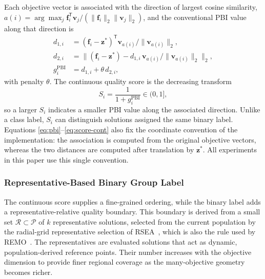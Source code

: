 \documentclass[final,5p,times,twocolumn]{elsarticle}
\newcommand{\vf}{\mathbf{f}}
\newcommand{\vv}{\mathbf{v}}
\newcommand{\vz}{\mathbf{z}}
\begin{document}
Each objective vector is associated with the direction of largest cosine
similarity, $a(i)=\arg\max_j
\vf_i^{\mathsf T}\vv_j/(\|\vf_i\|_2\|\vv_j\|_2)$, and the conventional
PBI value~\cite{ref:moead} along that direction is
\begin{equation}
\begin{aligned}
d_{1,i}&=(\vf_i-\vz^{*})^{\mathsf T}\vv_{a(i)}\big/\|\vv_{a(i)}\|_2,\\
d_{2,i}&=\bigl\|(\vf_i-\vz^{*})
        -d_{1,i}\,\vv_{a(i)}/\|\vv_{a(i)}\|_2\bigr\|_2,\\
g_i^{\mathrm{PBI}}&=d_{1,i}+\theta\,d_{2,i},
\end{aligned}
\label{eq:pbi}
\end{equation}
with penalty $\theta$. The continuous quality score is the decreasing transform
\begin{equation}
S_i=\frac{1}{1+g_i^{\mathrm{PBI}}}\in(0,1],
\label{eq:score-cont}
\end{equation}
so a larger $S_i$ indicates a smaller PBI value along the associated direction.
Unlike a class label, $S_i$ can distinguish solutions assigned the same binary
label.
Equations \eqref{eq:pbi}--\eqref{eq:score-cont} also fix the coordinate
convention of the implementation: the association is computed from the original
objective vectors, whereas the two distances are computed after translation by
$\vz^{*}$. All experiments in this paper use this single convention.

\subsubsection{Representative-Based Binary Group Label}
\label{sec:method:hpc:coarse}

The continuous score supplies a fine-grained ordering, while the binary label
adds a representative-relative quality boundary. This boundary is derived from a small set
$\mathcal{R}\subset\mathcal{P}$ of $k$ representative solutions, selected from
the current population by the radial-grid representative selection of
RSEA~\cite{ref:rsea}, which is also the rule used by REMO~\cite{ref:remo}. The
representatives are evaluated solutions that act as dynamic, population-derived
reference points. Their number increases with the objective dimension to provide
finer regional coverage as the many-objective geometry becomes richer.
\end{document}
